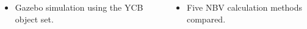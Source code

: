 
\begin{columns}[t,totalwidth=\twocolwid]

\begin{column}{\onecolwid}
	\begin{itemize}
		\item Gazebo simulation using the YCB object set\cite{calli2015benchmarking}.
	\end{itemize}
\end{column}

\begin{column}{\sepwid}
\end{column} %

\begin{column}{\onecolwid}
	\begin{itemize}
		\item Five NBV calculation methods compared.
	\end{itemize}
\end{column}
\end{columns}


